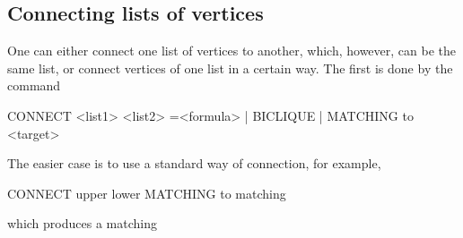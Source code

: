 \subsection{Connecting lists of vertices}

One can either connect one list of vertices to another, which, however, can be the same list, or connect vertices of one list in a certain way. The first is done by the command

\begin{tcolorbox}[colback=lightpink]
  CONNECT <list1> <list2> =<formula> | BICLIQUE | MATCHING to <target>
\end{tcolorbox}

The easier case is to use a standard way of connection, for example,

\begin{tcolorbox}[colback=palegreen]
  CONNECT upper lower MATCHING to matching
\end{tcolorbox}
which produces a matching

